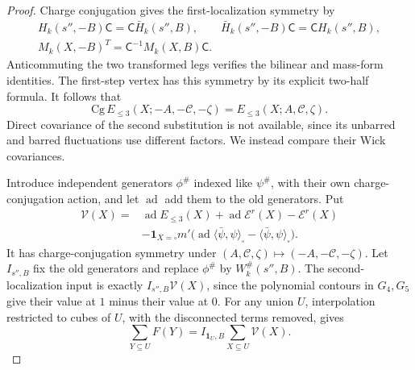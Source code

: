 \begin{proof}
Charge conjugation gives the first-localization symmetry
by
\[
 \begin{gathered}
 H_k(s'',-B)\mathsf C=\mathsf C\bar H_k(s'',B),\qquad
 \bar H_k(s'',-B)\mathsf C=\mathsf C H_k(s'',B),\\
 M_k(X,-B)^T=\mathsf C^{-1}M_k(X,B)\mathsf C .
 \end{gathered}
\]
Anticommuting the two transformed legs verifies the
bilinear and mass-form identities. The first-step
vertex has this symmetry by its explicit two-half formula.
It follows that
\[
 \mathrm{Cg}\,E_{\le3}(X;-A,-\mathscr C,-\zeta)
                                        =E_{\le3}(X;A,\mathscr C,\zeta).
\]
Direct covariance of the second substitution is not
available, since its unbarred and barred fluctuations
use different factors. We instead compare their Wick
covariances.

Introduce independent generators $\phi^\#$ indexed like
$\psi^\#$, with their own charge-conjugation action,
and let $\operatorname{ad}$ add them to the old generators.
Put
\begin{align*}
 \mathcal V(X)
   ={}&\operatorname{ad}E_{\le3}(X)
      +\operatorname{ad}\mathscr E^r(X)-\mathscr E^r(X)\\
     &-\mathbf1_{X=\square}m'
          \big(\operatorname{ad}
                         \langle\bar\psi,\psi\rangle_\square
                                -\langle\bar\psi,\psi\rangle_\square\big).
\end{align*}
It has charge-conjugation symmetry under
$(A,\mathscr C,\zeta)\mapsto(-A,-\mathscr C,-\zeta)$.
Let $I_{s'',B}$ fix the old generators and replace
$\phi^\#$ by $W_k^\#(s'',B)$. The second-localization
input is exactly $I_{s'',B}\mathcal V(X)$, since
the polynomial contours in $G_4,G_5$ give their value
at $1$ minus their value at $0$.
For any union $U$, interpolation restricted to cubes
of $U$, with the disconnected terms removed, gives
\begin{equation}\label{eq:rgnl-subvolume-substitution}
 \sum_{Y\subseteq U}F(Y)=
                        I_{\mathbf1_U,B}\sum_{X\subseteq U}\mathcal V(X).
\end{equation}


\end{proof}
